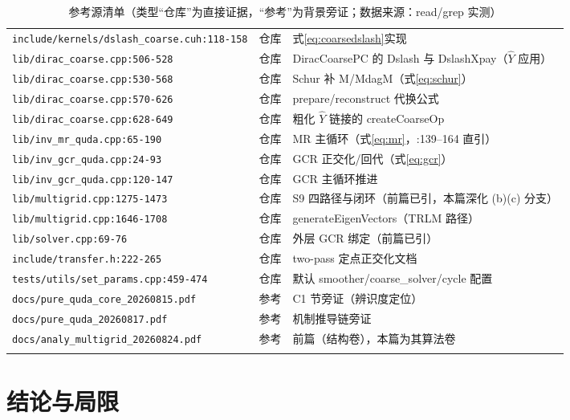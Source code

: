 \documentclass[UTF8]{ctexart}
\begin{document}
\begin{xltabular}{\textwidth}{llX}
\texttt{\nolinkurl{include/kernels/dslash_coarse.cuh:118-158}} & 仓库 & 式\eqref{eq:coarsedslash}实现 \\
\texttt{\nolinkurl{lib/dirac_coarse.cpp:506-528}} & 仓库 & DiracCoarsePC 的 Dslash 与 DslashXpay（$\hat Y$ 应用） \\
\texttt{\nolinkurl{lib/dirac_coarse.cpp:530-568}} & 仓库 & Schur 补 M/MdagM（式\eqref{eq:schur}） \\
\texttt{\nolinkurl{lib/dirac_coarse.cpp:570-626}} & 仓库 & prepare/reconstruct 代换公式 \\
\texttt{\nolinkurl{lib/dirac_coarse.cpp:628-649}} & 仓库 & 粗化 $\hat Y$ 链接的 createCoarseOp \\
\texttt{\nolinkurl{lib/inv_mr_quda.cpp:65-190}} & 仓库 & MR 主循环（式\eqref{eq:mr}，:139--164 直引） \\
\texttt{\nolinkurl{lib/inv_gcr_quda.cpp:24-93}} & 仓库 & GCR 正交化/回代（式\eqref{eq:gcr}） \\
\texttt{\nolinkurl{lib/inv_gcr_quda.cpp:120-147}} & 仓库 & GCR 主循环推进 \\
\texttt{\nolinkurl{lib/multigrid.cpp:1275-1473}} & 仓库 & S9 四路径与闭环（前篇已引，本篇深化 (b)(c) 分支） \\
\texttt{\nolinkurl{lib/multigrid.cpp:1646-1708}} & 仓库 & generateEigenVectors（TRLM 路径） \\
\texttt{\nolinkurl{lib/solver.cpp:69-76}} & 仓库 & 外层 GCR 绑定（前篇已引） \\
\texttt{\nolinkurl{include/transfer.h:222-265}} & 仓库 & two-pass 定点正交化文档 \\
\texttt{\nolinkurl{tests/utils/set_params.cpp:459-474}} & 仓库 & 默认 smoother/coarse\_solver/cycle 配置 \\
\textcolor{reference}{\texttt{\nolinkurl{docs/pure_quda_core_20260815.pdf}}} & 参考 & C1 节旁证（辨识度定位） \\
\textcolor{reference}{\texttt{\nolinkurl{docs/pure_quda_20260817.pdf}}} & 参考 & 机制推导链旁证 \\
\textcolor{reference}{\texttt{\nolinkurl{docs/analy_multigrid_20260824.pdf}}} & 参考 & 前篇（结构卷），本篇为其算法卷 \\
\bottomrule
\caption{参考源清单（类型``仓库''为直接证据，``参考''为背景旁证；数据来源：read/grep 实测）}
\end{xltabular}

\section{结论与局限}
\end{document}
